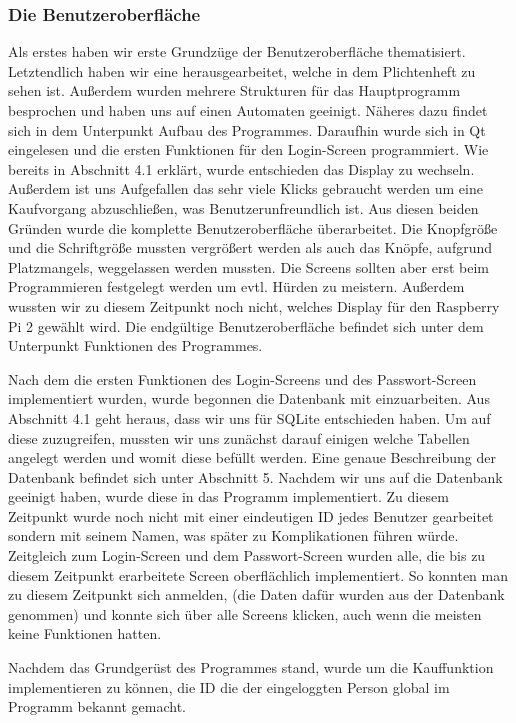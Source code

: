 \documentclass[11pt,a4paper]{article} %
\begin{document}
\subsubsection{Die Benutzeroberfl\"ache}
Als erstes haben wir erste Grundzüge der Benutzeroberfläche thematisiert. Letztendlich haben wir eine herausgearbeitet, welche in dem Plichtenheft zu sehen ist.
Außerdem wurden mehrere Strukturen für das Hauptprogramm besprochen und haben uns auf einen Automaten geeinigt. Näheres dazu findet sich in dem Unterpunkt Aufbau des Programmes.
Daraufhin wurde sich in Qt eingelesen und die ersten Funktionen für den Login-Screen programmiert.
Wie bereits in Abschnitt 4.1 erklärt, wurde entschieden das Display zu wechseln.
Außerdem ist uns Aufgefallen das  sehr viele Klicks gebraucht werden um eine Kaufvorgang abzuschließen, was Benutzerunfreundlich ist.
Aus diesen beiden Gründen wurde die komplette Benutzeroberfläche überarbeitet.
Die Knopfgröße und die Schriftgröße mussten vergrößert werden als auch das Knöpfe, aufgrund Platzmangels, weggelassen werden mussten.
Die Screens sollten aber erst beim Programmieren festgelegt werden  um evtl. Hürden zu meistern.
Außerdem wussten wir zu diesem Zeitpunkt noch nicht, welches Display für den Raspberry Pi 2 gewählt wird.
Die endgültige Benutzeroberfläche befindet sich unter dem Unterpunkt Funktionen des Programmes.
\par
Nach dem die ersten Funktionen des Login-Screens und des Passwort-Screen implementiert wurden, wurde begonnen die Datenbank mit einzuarbeiten.
Aus Abschnitt 4.1 geht heraus, dass wir uns für SQLite entschieden haben. Um auf diese zuzugreifen, mussten wir uns zunächst darauf einigen welche Tabellen angelegt werden  und womit diese befüllt werden.
Eine genaue Beschreibung der Datenbank befindet sich unter Abschnitt 5.
Nachdem wir uns auf die Datenbank geeinigt haben, wurde diese in das Programm implementiert.
Zu diesem Zeitpunkt wurde noch nicht mit einer eindeutigen ID jedes Benutzer gearbeitet sondern mit seinem Namen, was später zu Komplikationen führen würde.
Zeitgleich zum Login-Screen und dem Passwort-Screen wurden alle, die bis zu diesem Zeitpunkt erarbeitete Screen oberflächlich implementiert.
So konnten man zu diesem Zeitpunkt sich anmelden, (die Daten dafür wurden aus der Datenbank genommen) und konnte sich über alle Screens klicken, auch wenn die meisten keine Funktionen hatten.
\par
Nachdem das Grundgerüst des Programmes stand, wurde um die Kauffunktion implementieren zu können, die ID die der eingeloggten Person global im Programm bekannt gemacht.
\end{document}
